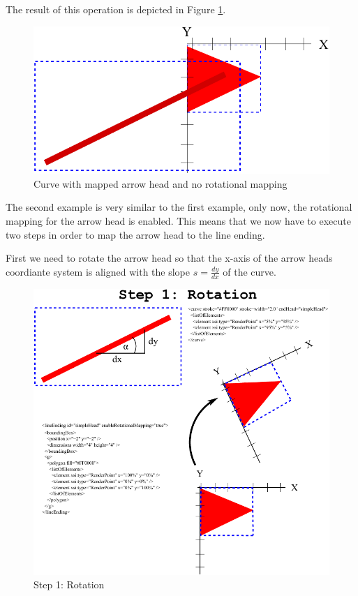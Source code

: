 The result of this operation is depicted in Figure \ref{fig:3ArrowHeadMapping}.

\begin{figure}[!h]
\begin{center}
\includegraphics{figures/ArrowHeadMapping3.pdf}
\end{center}
\caption{Curve with mapped arrow head and no rotational mapping} \label{fig:3ArrowHeadMapping}
\end{figure}

The second example is very similar to the first example, only now, the rotational mapping for the arrow head is enabled.
This means that we now have to execute two steps in order to map the arrow head to the line ending.

First we need to rotate the arrow head so that the x-axis of the arrow heads coordiante system is aligned with the slope $s=\frac{dy}{dx}$ of the curve.

\begin{figure}[!h]
\begin{center}
\includegraphics{figures/ArrowHeadMapping6.pdf}
\end{center}
\caption{Step 1: Rotation}
\label{ArrowHeadMapping6}
\end{figure}

